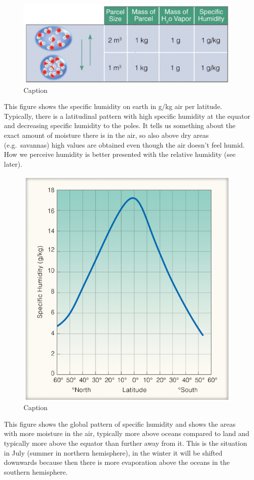 \documentclass[12pt,oneside]{book}
\begin{document}
\begin{figure}

{\centering \includegraphics[width=1\linewidth]{figures/Figure229} 

}

\caption{Caption}\label{fig:Humidityterm3}
\end{figure}

This figure shows the specific humidity on earth in g/kg air per
latitude. Typically, there is a latitudinal pattern with high specific
humidity at the equator and decreasing specific humidity to the poles.
It tells us something about the exact amount of moisture there is in the
air, so also above dry areas (e.g.~savannas) high values are obtained
even though the air doesn't feel humid. How we perceive humidity is
better presented with the relative humidity (see later).

\begin{figure}

{\centering \includegraphics[width=0.5\linewidth]{figures/Figure230} 

}

\caption{Caption}\label{fig:Humidityterm4}
\end{figure}

This figure shows the global pattern of specific humidity and shows the
areas with more moisture in the air, typically more above oceans
compared to land and typically more above the equator than further away
from it. This is the situation in July (summer in northern hemisphere),
in the winter it will be shifted downwards because then there is more
evaporation above the oceans in the southern hemisphere.
\end{document}
